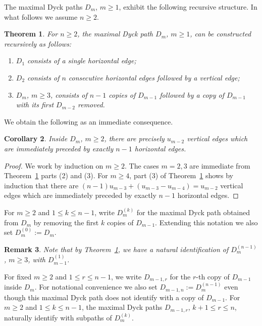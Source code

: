 \documentclass{amsart}
\newtheorem{theorem}{Theorem}[section]
\newtheorem{corollary}[theorem]{Corollary}
\newtheorem{remark}[theorem]{Remark}
\begin{document}
The maximal Dyck paths $D_m$, $m\ge1$, exhibit the following recursive structure.
In what follows we assume $n\ge2$.
\begin{theorem}
  \cite[Corollary 2.4]{rupel}
  \label{th:dyck path recursion}
  For $n\ge2$, the maximal Dyck path $D_m$, $m\ge1$, can be constructed recursively as follows:
  \begin{enumerate}
    \item $D_1$ consists of a single horizontal edge;
    \item $D_2$ consists of $n$ consecutive horizontal edges followed by a vertical edge;
    \item $D_m$, $m\ge3$, consists of $n-1$ copies of $D_{m-1}$ followed by a copy of $D_{m-1}$ with its first $D_{m-2}$ removed.
  \end{enumerate}
\end{theorem}

We obtain the following as an immediate consequence.
\begin{corollary}
  \label{cor:short hooks}
  Inside $D_m$, $m\ge2$, there are precisely $u_{m-2}$ vertical edges which are immediately preceded by exactly $n-1$ horizontal edges.
\end{corollary}
\begin{proof}
  We work by induction on $m\ge2$.
  The cases $m=2,3$ are immediate from Theorem~\ref{th:dyck path recursion} parts (2) and (3).
  For $m\ge4$, part (3) of Theorem~\ref{th:dyck path recursion} shows by induction that there are $(n-1)u_{m-3}+(u_{m-3}-u_{m-4})=u_{m-2}$ vertical edges which are immediately preceded by exactly $n-1$ horizontal edges.
\end{proof}

For $m\ge2$ and $1\le k\le n-1$, write $D_m^{(k)}$ for the maximal Dyck path obtained from $D_m$ by removing the first $k$ copies of $D_{m-1}$.
Extending this notation we also set $D_m^{(0)}:=D_m$.
\begin{remark}
  Note that by Theorem~\ref{th:dyck path recursion}, we have a natural identification of $D_m^{(n-1)}$, $m\ge3$, with $D_{m-1}^{(1)}$.
\end{remark}
For fixed $m\ge2$ and $1\le r\le n-1$, we write $D_{m-1,r}$ for the $r$-th copy of $D_{m-1}$ inside $D_m$.
For notational convenience we also set $D_{m-1,n}:=D_m^{(n-1)}$ even though this maximal Dyck path does not identify with a copy of $D_{m-1}$.
For $m\ge2$ and $1\le k\le n-1$, the maximal Dyck paths $D_{m-1,r}$, $k+1\le r\le n$, naturally identify with subpaths of $D_m^{(k)}$.
\end{document}
